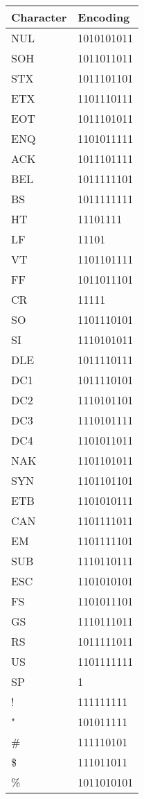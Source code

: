 		\begin{longtable}{ l l }
			Character & Encoding \\\hline
			NUL & 1010101011 \\
			SOH & 1011011011 \\
			STX & 1011101101 \\
			ETX & 1101110111 \\
			EOT & 1011101011 \\
			ENQ & 1101011111 \\
			ACK & 1011101111 \\
			BEL & 1011111101 \\
			BS  & 1011111111 \\
			HT  & 11101111 \\
			LF  & 11101 \\
			VT  & 1101101111 \\
			FF  & 1011011101 \\
			CR  & 11111 \\
			SO  & 1101110101 \\
			SI  & 1110101011 \\
			DLE & 1011110111 \\
			DC1 & 1011110101 \\
			DC2 & 1110101101 \\
			DC3 & 1110101111 \\
			DC4 & 1101011011 \\
			NAK & 1101101011 \\
			SYN & 1101101101 \\
			ETB & 1101010111 \\
			CAN & 1101111011 \\
			EM  & 1101111101 \\
			SUB & 1110110111 \\
			ESC & 1101010101 \\
			FS  & 1101011101 \\
			GS  & 1110111011 \\
			RS  & 1011111011 \\
			US  & 1101111111 \\
			SP  & 1 \\
			!   & 111111111 \\
			"   & 101011111 \\
			\#  & 111110101 \\
			\$  & 111011011 \\
			\%  & 1011010101 \\

\end{longtable}
